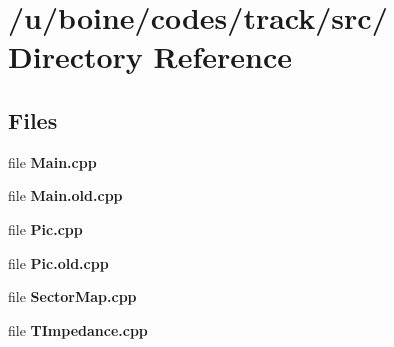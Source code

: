 \section{/u/boine/codes/track/src/ Directory Reference}
\label{dir_000001}
\subsection*{Files}
\begin{CompactItemize}
\item 
file {\bf Main.cpp}
\item 
file {\bf Main.old.cpp}
\item 
file {\bf Pic.cpp}
\item 
file {\bf Pic.old.cpp}
\item 
file {\bf Sector\-Map.cpp}
\item 
file {\bf TImpedance.cpp}
\end{CompactItemize}
